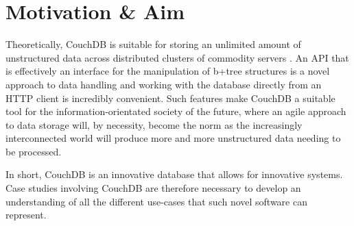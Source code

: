 \section{Motivation \& Aim}
Theoretically, CouchDB is suitable for storing an unlimited amount of unstructured data across distributed clusters of commodity servers \cite{couchdb2.0}. An API that is effectively an interface for the manipulation of b+tree structures is a novel approach to data handling and working with the database directly from an HTTP client is incredibly convenient. Such features make CouchDB a suitable tool for the information-orientated society of the future, where an agile approach to data storage will, by necessity, become the norm as the increasingly interconnected world will produce more and more unstructured data needing to be processed.

In short, CouchDB is an innovative database that allows for innovative systems. Case studies involving CouchDB are therefore necessary to develop an understanding of all the different use-cases that such novel software can represent.
